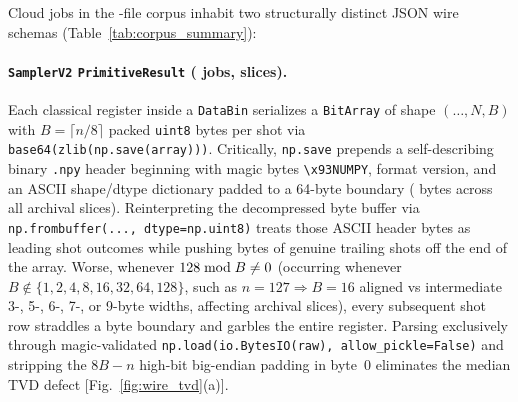 \documentclass[twocolumn,aps,prapplied,superscriptaddress,floatfix]{revtex4-2}
\begin{document}
Cloud jobs in the \QdTotalJobs{}-file corpus inhabit two structurally distinct JSON wire schemas (Table~\ref{tab:corpus_summary}):

\paragraph{\texttt{SamplerV2} \texttt{PrimitiveResult} (\QdPrimJobs{} jobs, \QdPrimSlices{} slices).} Each classical register inside a \texttt{DataBin} serializes a \texttt{BitArray} of shape $(\ldots, N, B)$ with $B = \lceil n / 8 \rceil$ packed \texttt{uint8} bytes per shot via \texttt{base64(zlib(np.save(array)))}. Critically, \texttt{np.save} prepends a self-describing binary \texttt{.npy} header beginning with magic bytes \texttt{\textbackslash x93NUMPY}, format version, and an ASCII shape/dtype dictionary padded to a 64-byte boundary (\QdNpyHeaderBytes{} bytes across all \QdPrimSlices{} archival slices). Reinterpreting the decompressed byte buffer via \texttt{np.frombuffer(..., dtype=np.uint8)} treats those \QdNpyHeaderBytes{} ASCII header bytes as leading shot outcomes while pushing \QdNpyHeaderBytes{} bytes of genuine trailing shots off the end of the array. Worse, whenever $128 \bmod B \neq 0$ (occurring whenever $B \notin \{1,2,4,8,16,32,64,128\}$, such as $n=127 \Rightarrow B=16$ aligned vs intermediate 3-, 5-, 6-, 7-, or 9-byte widths, affecting \QdUnalignedSlices{} archival slices), every subsequent shot row straddles a byte boundary and garbles the entire register. Parsing exclusively through magic-validated \texttt{np.load(io.BytesIO(raw), allow\_pickle=False)} and stripping the $8B - n$ high-bit big-endian padding in byte~$0$ eliminates the \QdLegacyTvdMedian{} median TVD defect [Fig.~\ref{fig:wire_tvd}(a)].
\end{document}
